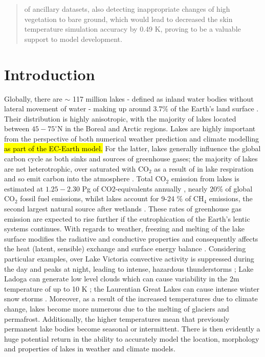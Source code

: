 \documentclass[hess, manuscript]{copernicus}
\begin{document}
\begin{abstract}
of ancillary datasets, also detecting inappropriate changes of high vegetation to bare ground, which would lead to decreased the skin temperature simulation accuracy by 0.49 K, proving to be a valuable support to model development.
\end{abstract}




\section{Introduction}
\noindent Globally, there are $\sim$ 117 million lakes - defined as inland water bodies without lateral movement of water - making up around 3.7$\%$ of the Earth's land surface \citep{Verpoorter2014}. Their distribution is highly anisotropic, with the majority of lakes located between $45-75^{\circ}$N in the Boreal and Arctic regions. Lakes are highly important from the perspective of both numerical weather prediction and climate modelling \hl{as part of the EC-Earth model.}  For the latter, lakes generally influence the global carbon cycle as both sinks and sources of greenhouse gases; the majority of lakes are net heterotrophic, over saturated with CO$_2$ as a result of in lake respiration and so emit carbon into the atmosphere \citep{Pace2005,Tranvik2009}.  Total CO$_2$ emission from lakes is estimated at $1.25 - 2.30$ Pg of CO2-equivalents annually \citep{DelSontro2018}, nearly $20 \%$ of global CO$_2$ fossil fuel emissions, whilst lakes account for 9-24 $\%$  of CH$_4$ emissions, the second largest natural source after wetlands \citep{Saunois2020}. These rates of greenhouse gas emission are expected to rise further if the eutrophication of the Earth's lentic systems continues. With regards to weather, freezing and melting of the lake surface modifies the radiative and conductive properties and consequently affects the heat (latent, sensible) exchange and surface energy balance \citep{Huang2019,Peng2020,Franz2018}. Considering particular examples, over Lake Victoria convective activity is suppressed during the day and peaks at night, leading to intense, hazardous thunderstorms \citep{Thiery2015,Thiery_2017}; Lake Ladoga can generate low level clouds which can cause variability in the 2m temperature of up to 10 K \citep{Eerola2014}; the Laurentian Great Lakes can cause intense winter snow storms \citep{Vavrus2013} \citep{Notaro2013}. Moreover, as a result of the increased temperatures due to climate change, lakes become more numerous due to the melting of glaciers and permafrost. Additionally, the higher temperatures mean that previously permanent lake bodies become seasonal or intermittent. There is then evidently a huge potential return in the ability to accurately model the location, morphology and properties of lakes in weather and climate models. \newline 
\end{document}
